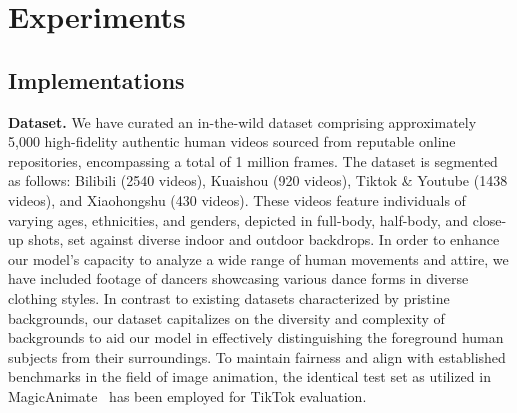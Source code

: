 
\section{Experiments}
\label{sec:exp}

\subsection{Implementations}
\textbf{Dataset.}
We have curated an in-the-wild dataset comprising approximately 5,000 high-fidelity authentic human videos sourced from reputable online repositories, encompassing a total of 1 million frames. 
The dataset is segmented as follows: Bilibili (2540 videos), Kuaishou (920 videos), Tiktok \& Youtube (1438 videos), and Xiaohongshu (430 videos). 
These videos feature individuals of varying ages, ethnicities, and genders, depicted in full-body, half-body, and close-up shots, set against diverse indoor and outdoor backdrops.
In order to enhance our model's capacity to analyze a wide range of human movements and attire, we have included footage of dancers showcasing various dance forms in diverse clothing styles. 
In contrast to existing datasets characterized by pristine backgrounds, our dataset capitalizes on the diversity and complexity of backgrounds to aid our model in effectively distinguishing the foreground human subjects from their surroundings.
To maintain fairness and align with established benchmarks in the field of image animation, the identical test set as utilized in MagicAnimate~\cite{xu2023magicanimate} has been employed for TikTok evaluation.

